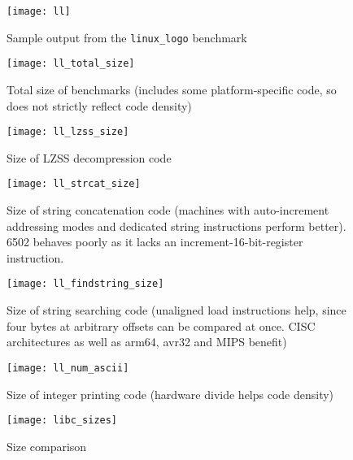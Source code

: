 \documentclass{article}[10pt]
\begin{document}
\begin{figure}[tbp]
  \centering
	\texttt{[image: ll]}
  \caption{Sample output from the {\tt linux\_logo} benchmark}
  \label{figure:ll}
\end{figure}

%
%

\noindent




\begin{figure}[tbp]
  \centering
	\texttt{[image: ll\_total\_size]}
  \caption{Total size of benchmarks 
           (includes some platform-specific code, so does not
           strictly reflect code density)}
  \label{figure:total}
\end{figure}

\begin{figure}[tbp]
  \centering
	\texttt{[image: ll\_lzss\_size]}
  \caption{Size of LZSS decompression code}
  \label{figure:decomp}
\end{figure}

\begin{figure}[tbp]
  \centering
	\texttt{[image: ll\_strcat\_size]}
  \caption{Size of string concatenation code (machines with 
           auto-increment addressing modes and dedicated
           string instructions perform better). 6502 behaves poorly as it
           lacks an increment-16-bit-register instruction.}
  \label{figure:strcat}
\end{figure}

\begin{figure}[tbp]
  \centering
	\texttt{[image: ll\_findstring\_size]}
  \caption{Size of string searching code (unaligned load
           instructions help, since four bytes at arbitrary offsets 
           can be compared at once.  
           CISC architectures as well as arm64, avr32 and MIPS benefit)}
  \label{figure:findstring}
\end{figure}

\begin{figure}[tbp]
  \centering
	\texttt{[image: ll\_num\_ascii]}
  \caption{Size of integer printing code (hardware
           divide helps code density)}
  \label{figure:numascii}
\end{figure}

\begin{figure}[tbp]
  \centering
	\texttt{[image: libc\_sizes]}
  \caption{Size comparison}
  \label{figure:libc}
\end{figure}

\pagebreak

{


}
\end{document}
